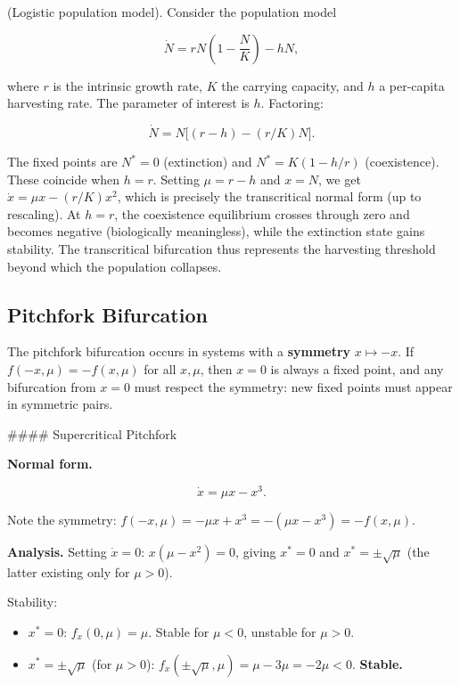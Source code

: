 \begin{example}
(Logistic population model). Consider the population model

\[
\dot{N} = rN\left(1 - \frac{N}{K}\right) - hN,
\]

where $r$ is the intrinsic growth rate, $K$ the carrying capacity, and $h$ a per-capita harvesting rate. The parameter of interest is $h$. Factoring:

\[
\dot{N} = N\bigl[(r - h) - (r/K)N\bigr].
\]

The fixed points are $N^* = 0$ (extinction) and $N^* = K(1 - h/r)$ (coexistence). These coincide when $h = r$. Setting $\mu = r - h$ and $x = N$, we get $\dot{x} = \mu x - (r/K) x^2$, which is precisely the transcritical normal form (up to rescaling). At $h = r$, the coexistence equilibrium crosses through zero and becomes negative (biologically meaningless), while the extinction state gains stability. The transcritical bifurcation thus represents the harvesting threshold beyond which the population collapses.
\end{example}


\subsection{Pitchfork Bifurcation}\label{sec:5.2.3}

The pitchfork bifurcation occurs in systems with a \textbf{symmetry} $x \mapsto -x$. If $f(-x, \mu) = -f(x, \mu)$ for all $x, \mu$, then $x = 0$ is always a fixed point, and any bifurcation from $x = 0$ must respect the symmetry: new fixed points must appear in symmetric pairs.

\#\#\#\# Supercritical Pitchfork

\textbf{Normal form.}

\begin{equation}\label{eq:5.3}\tag{5.3}
\dot{x} = \mu x - x^3.
\end{equation}

Note the symmetry: $f(-x, \mu) = -\mu x + x^3 = -(\mu x - x^3) = -f(x, \mu)$.

\textbf{Analysis.} Setting $\dot{x} = 0$: $x(\mu - x^2) = 0$, giving $x^* = 0$ and $x^* = \pm\sqrt{\mu}$ (the latter existing only for $\mu > 0$).

Stability:
\begin{itemize}[nosep]
  \item $x^* = 0$: $f_x(0, \mu) = \mu$. Stable for $\mu < 0$, unstable for $\mu > 0$.
  \item $x^* = \pm\sqrt{\mu}$ (for $\mu > 0$): $f_x(\pm\sqrt{\mu}, \mu) = \mu - 3\mu = -2\mu < 0$. \textbf{Stable.}
\end{itemize}


